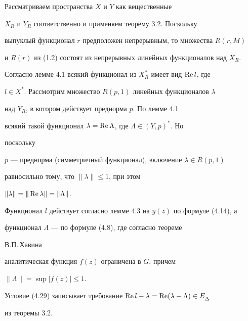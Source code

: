  


\begin{pf} 


Рассматриваем пространства $X$ и $Y$ как вещественные 


$X_R$ и $Y_R$ соответственно и применяем теорему 3.2. Поскольку 


выпуклый функционал $r$ предположен непрерывным, то множества $R(r,M)$ 


и $R(r)$ из (1.2) состоят из непрерывных линейных функционалов над $X_R$. 


Согласно лемме 4.1 всякий функционал из $X^*_R$ имеет вид $\operatorname{Re} l$, где 


$l\in X^*$. Рассмотрим множество $R(p,1)$ линейных функционалов $\lambda$ 


над $Y_R$, в котором действует преднорма $p$. По лемме 4.1 


всякий такой функционал $\lambda=\operatorname{Re}\Lambda$, где $\Lambda\in(Y,p)^*$. Но 


поскольку 


$p$ --- преднорма (симметричный функционал), включение $\lambda\in 


R(p,1)$ 


равносильно тому, что $\|\lambda\|\le1$, при этом 


$\|\lambda\|=\|\operatorname{Re}\lambda\|=\|\Lambda\|$. 


Функционал $l$ действует согласно лемме 4.3 на $y(z)$ по формуле (4.14), а 


функционал $\Lambda$ --- по формуле (4.8), где согласно теореме 


В.П.\,Хавина 


аналитическая функция $f(z)$ ограничена в $G$, причем 


$\|\Lambda\|=\sup|f(z)|\le1$. 


Условие (4.29) записывает требование $\re 


l-\lambda=\re(\lambda-\Lambda)\in E^-_\Delta$ 


из теоремы 3.2. 


\end{pf} 


 


